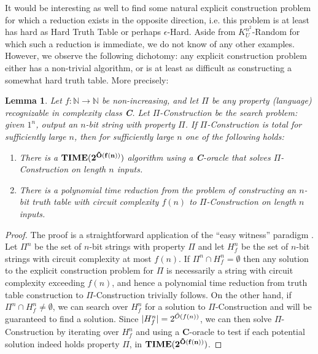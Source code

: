 \documentclass[11pt]{article}
\newtheorem{lemma}{Lemma}
\def\cl{\bf}
\begin{document}
It would be interesting as well to find some natural explicit construction problem for which a reduction exists in the opposite direction, i.e. this problem is at least has hard as {\sc Hard Truth Table} or perhaps {\sc $\epsilon$-Hard}. Aside from {\sc $K^{n^2}_U$-Random} for which such a reduction is immediate, we do not know of any other examples. However, we observe the following dichotomy: any explicit construction problem either has a non-trivial algorithm, or is at least as difficult as constructing a somewhat hard truth table. More precisely:
\begin{lemma}
Let $f: \mathbb{N} \rightarrow \mathbb{N}$ be non-increasing, and let $\Pi$ be any property (language) recognizable in complexity class {\cl C}. Let {\sc $\Pi$-Construction} be the search problem: given $1^n$, output an $n$-bit string with property $\Pi$. If {\sc $\Pi$-Construction} is total for sufficiently large $n$, then for sufficiently large $n$ one of the following holds:
\begin{enumerate}
    \item There is a ${\cl TIME(2^{\Tilde{O}(f(n))})}$ algorithm using a {\cl C}-oracle that solves {\sc $\Pi$-Construction} on length $n$ inputs.
    \item There is a polynomial time reduction from the problem of constructing an $n$-bit truth table with circuit complexity $f(n)$ to {\sc $\Pi$-Construction} on length $n$ inputs.
\end{enumerate}
\end{lemma}
\begin{proof}
The proof is a straightforward application of the ``easy witness'' paradigm \cite{easy-witness}. Let $\Pi^n$ be the set of $n$-bit strings with property $\Pi$ and let $H_f^n$ be the set of $n$-bit strings with circuit complexity at most $f(n)$. If $\Pi^n \cap H_f^n = \emptyset$ then any solution to the explicit construction problem for $\Pi$ is necessarily a string with circuit complexity exceeding $f(n)$, and hence a polynomial time reduction from truth table construction to {\sc $\Pi$-Construction} trivially follows. On the other hand, if $\Pi^n \cap H_f^n \neq \emptyset$, we can search over $H_f^n$ for a solution to {\sc $\Pi$-Construction} and will be guaranteed to find a solution. Since $|H_f^n| = 2^{\Tilde{O}(f(n))}$, we can then solve {\sc $\Pi$-Construction} by iterating over $H_f^n$ and using a {\cl C}-oracle to test if each potential solution indeed holds property $\Pi$, in ${\cl TIME(2^{\Tilde{O}(f(n))})}$.
\end{proof}
\end{document}
